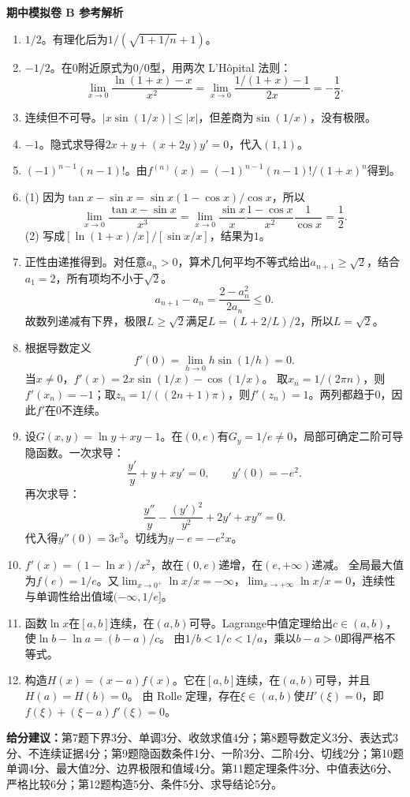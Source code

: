 \documentclass[11pt,a4paper,fontset=fandol]{ctexart}
\newcommand{\answerpaper}[1]{\clearpage\begin{center}{\LARGE\bfseries #1}\end{center}}
\begin{document}
\answerpaper{期中模拟卷 B 参考解析}
\begin{enumerate}
\item $1/2$。有理化后为$1/(\sqrt{1+1/n}+1)$。
\item $-1/2$。在$0$附近原式为$0/0$型，用两次 L'Hôpital 法则：
\[\lim_{x\to0}\frac{\ln(1+x)-x}{x^2}
=\lim_{x\to0}\frac{1/(1+x)-1}{2x}=-\frac12.\]
\item 连续但不可导。$|x\sin(1/x)|\le|x|$，但差商为$\sin(1/x)$，没有极限。
\item $-1$。隐式求导得$2x+y+(x+2y)y'=0$，代入$(1,1)$。
\item $(-1)^{n-1}(n-1)!$。由$f^{(n)}(x)=(-1)^{n-1}(n-1)!/(1+x)^n$得到。
\item (1) 因为$\tan x-\sin x=\sin x(1-\cos x)/\cos x$，所以
\[\lim_{x\to0}\frac{\tan x-\sin x}{x^3}
=\lim_{x\to0}\frac{\sin x}{x}\frac{1-\cos x}{x^2}\frac1{\cos x}=\frac12.\]
(2) 写成$[\ln(1+x)/x]/[\sin x/x]$，结果为$1$。
\item 正性由递推得到。对任意$a_n>0$，算术几何平均不等式给出$a_{n+1}\ge\sqrt2$，结合$a_1=2$，所有项均不小于$\sqrt2$。
\[a_{n+1}-a_n=\frac{2-a_n^2}{2a_n}\le0.\]
故数列递减有下界，极限$L\ge\sqrt2$满足$L=(L+2/L)/2$，所以$L=\sqrt2$。
\item 根据导数定义
\[f'(0)=\lim_{h\to0}h\sin(1/h)=0.\]
当$x\ne0$，$f'(x)=2x\sin(1/x)-\cos(1/x)$。
取$x_n=1/(2\pi n)$，则$f'(x_n)=-1$；取$z_n=1/((2n+1)\pi)$，则$f'(z_n)=1$。两列都趋于$0$，因此$f'$在$0$不连续。
\item 设$G(x,y)=\ln y+xy-1$。在$(0,e)$有$G_y=1/e\ne0$，局部可确定二阶可导隐函数。一次求导：
\[\frac{y'}y+y+xy'=0,\qquad y'(0)=-e^2.\]
再次求导：
\[\frac{y''}y-\frac{(y')^2}{y^2}+2y'+xy''=0.\]
代入得$y''(0)=3e^3$。切线为$y-e=-e^2x$。
\item $f'(x)=(1-\ln x)/x^2$，故在$(0,e)$递增，在$(e,+\infty)$递减。
全局最大值为$f(e)=1/e$。又$\lim_{x\to0^+}\ln x/x=-\infty$，$\lim_{x\to+\infty}\ln x/x=0$，连续性与单调性给出值域$(-\infty,1/e]$。
\item 函数$\ln x$在$[a,b]$连续，在$(a,b)$可导。Lagrange中值定理给出$c\in(a,b)$，使$\ln b-\ln a=(b-a)/c$。
由$1/b<1/c<1/a$，乘以$b-a>0$即得严格不等式。
\item 构造$H(x)=(x-a)f(x)$。它在$[a,b]$连续，在$(a,b)$可导，并且$H(a)=H(b)=0$。
由 Rolle 定理，存在$\xi\in(a,b)$使$H'(\xi)=0$，即$f(\xi)+(\xi-a)f'(\xi)=0$。
\end{enumerate}
\textbf{给分建议：}第7题下界3分、单调3分、收敛求值4分；第8题导数定义3分、表达式3分、不连续证据4分；第9题隐函数条件1分、一阶3分、二阶4分、切线2分；第10题单调4分、最大值2分、边界极限和值域4分。第11题定理条件3分、中值表达6分、严格比较6分；第12题构造5分、条件5分、求导结论5分。
\end{document}
